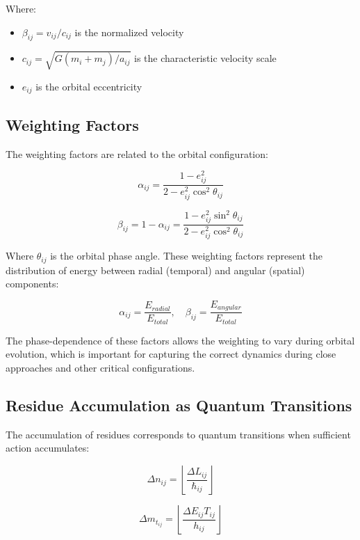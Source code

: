 \documentclass{article}
\begin{document}
Where:
\begin{itemize}
\item $\beta_{ij} = v_{ij}/c_{ij}$ is the normalized velocity
\item $c_{ij} = \sqrt{G(m_i+m_j)/a_{ij}}$ is the characteristic velocity scale
\item $e_{ij}$ is the orbital eccentricity
\end{itemize}

\subsection{Weighting Factors}

The weighting factors are related to the orbital configuration:

\begin{equation}
\alpha_{ij} = \frac{1-e_{ij}^2}{2-e_{ij}^2\cos^2\theta_{ij}}
\end{equation}

\begin{equation}
\beta_{ij} = 1 - \alpha_{ij} = \frac{1-e_{ij}^2\sin^2\theta_{ij}}{2-e_{ij}^2\cos^2\theta_{ij}}
\end{equation}

Where $\theta_{ij}$ is the orbital phase angle. These weighting factors represent the distribution of energy between radial (temporal) and angular (spatial) components:

\begin{equation}
\alpha_{ij} = \frac{E_{radial}}{E_{total}}, \quad \beta_{ij} = \frac{E_{angular}}{E_{total}}
\end{equation}

The phase-dependence of these factors allows the weighting to vary during orbital evolution, which is important for capturing the correct dynamics during close approaches and other critical configurations.

\subsection{Residue Accumulation as Quantum Transitions}

The accumulation of residues corresponds to quantum transitions when sufficient action accumulates:

\begin{equation}
\Delta n_{ij} = \left\lfloor \frac{\Delta L_{ij}}{\hbar_{ij}} \right\rfloor
\end{equation}

\begin{equation}
\Delta m_{t_{ij}} = \left\lfloor \frac{\Delta E_{ij}T_{ij}}{h_{ij}} \right\rfloor
\end{equation}
\end{document}
